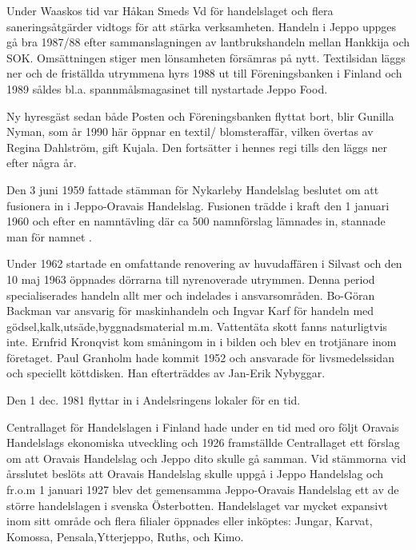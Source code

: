 Under Waaskos tid var Håkan Smeds Vd för handelslaget och flera saneringsåtgärder vidtogs för att stärka verksamheten. Handeln i Jeppo uppges gå bra 1987/88 efter sammanslagningen av lantbrukshandeln mellan Hankkija och SOK. Omsättningen stiger men lönsamheten försämras på nytt. Textilsidan läggs ner och de friställda utrymmena hyrs 1988 ut till Föreningsbanken i Finland och 1989 såldes bl.a. spannmålsmagasinet till nystartade Jeppo Food.

Ny hyresgäst sedan både Posten och Föreningsbanken flyttat bort, blir Gunilla Nyman, som år 1990 här öppnar en textil/ blomsteraffär, vilken övertas av Regina Dahlström, gift Kujala. Den fortsätter i hennes regi tills den läggs ner efter några år.


Den 3 juni 1959 fattade stämman för Nykarleby Handelslag  beslutet om att fusionera in i Jeppo-Oravais Handelslag. Fusionen trädde i kraft den 1 januari 1960 och efter en namntävling där ca 500 namnförslag lämnades in, stannade man för namnet .

Under 1962 startade en omfattande renovering av huvudaffären i Silvast och den 10 maj 1963 öppnades dörrarna till nyrenoverade utrymmen. Denna period specialiserades handeln allt mer och indelades i ansvarsområden. Bo-Göran Backman var ansvarig för maskinhandeln och Ingvar Karf för handeln med gödsel,kalk,utsäde,byggnadsmaterial m.m. Vattentäta skott fanns naturligtvis inte. Ernfrid Kronqvist kom småningom in i bilden och blev en trotjänare inom företaget. Paul Granholm hade kommit 1952 och ansvarade för livsmedelssidan och speciellt köttdisken. Han efterträddes av Jan-Erik Nybyggar.

Den 1 dec. 1981 flyttar  in i Andelsringens lokaler för en tid.


Centrallaget för Handelslagen i Finland hade under en tid med oro följt Oravais Handelslags ekonomiska utveckling och 1926 framställde Centrallaget ett förslag om att Oravais Handelslag och Jeppo dito skulle gå samman. Vid stämmorna vid årsslutet beslöts att Oravais Handelslag skulle uppgå i Jeppo Handelslag och fr.o.m 1 januari 1927 blev det gemensamma Jeppo-Oravais Handelslag ett av de större handelslagen i svenska Österbotten. Handelslaget var mycket expansivt inom sitt område och flera filialer öppnades eller inköptes: Jungar, Karvat, Komossa, Pensala,Ytterjeppo, Ruths, och Kimo.


